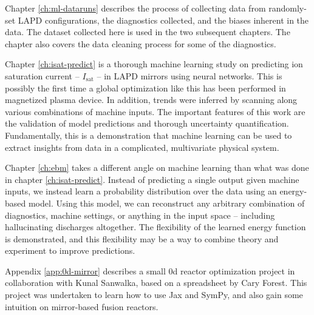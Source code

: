 Chapter \ref{ch:ml-dataruns} describes the process of collecting data from randomly-set LAPD configurations, the diagnostics collected, and the biases inherent in the data. The dataset collected here is used in the two subsequent chapters. The chapter also covers the data cleaning process for some of the diagnostics. 

Chapter \ref{ch:isat-predict} is a thorough machine learning study on predicting ion saturation current -- $I_\text{sat}$ -- in LAPD mirrors using neural networks. This is possibly the first time a global optimization like this has been performed in magnetized plasma device. In addition, trends were inferred by scanning along various combinations of machine inputs. The important features of this work are the validation of model predictions and thorough uncertainty quantification. Fundamentally, this is a demonstration that machine learning can be used to extract insights from data in a complicated, multivariate physical system. 

Chapter \ref{ch:ebm} takes a different angle on machine learning than what was done in chapter \ref{ch:isat-predict}. Instead of predicting a single output given machine inputs, we instead learn a probability distribution over the data using an energy-based model. Using this model, we can reconstruct any arbitrary combination of diagnostics, machine settings, or anything in the input space -- including hallucinating discharges altogether. The flexibility of the learned energy function is demonstrated, and this flexibility may be a way to combine theory and experiment to improve predictions. 

Appendix \ref{app:0d-mirror} describes a small 0d reactor optimization project in collaboration with Kunal Sanwalka, based on a spreadsheet by Cary Forest. This project was undertaken to learn how to use Jax and SymPy, and also gain some intuition on mirror-based fusion reactors.

